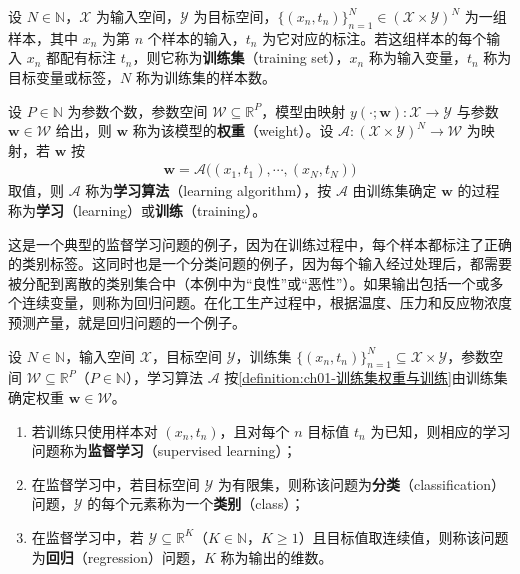 \documentclass[../../main.tex]{subfiles}
\begin{document}
\begin{definition}\label{definition:ch01-训练集权重与训练}
设 $N\in\mathbb{N}$，$\mathcal{X}$ 为输入空间，$\mathcal{Y}$ 为目标空间，$\{(x_n,t_n)\}_{n=1}^{N}\in(\mathcal{X}\times\mathcal{Y})^{N}$ 为一组样本，其中 $x_n$ 为第 $n$ 个样本的输入，$t_n$ 为它对应的标注。若这组样本的每个输入 $x_n$ 都配有标注 $t_n$，则它称为\textbf{训练集}（training set），$x_n$ 称为输入变量，$t_n$ 称为目标变量或标签，$N$ 称为训练集的样本数。

设 $P\in\mathbb{N}$ 为参数个数，参数空间 $\mathcal{W}\subseteq\mathbb{R}^{P}$，模型由映射 $y(\cdot;\mathbf{w}):\mathcal{X}\to\mathcal{Y}$ 与参数 $\mathbf{w}\in\mathcal{W}$ 给出，则 $\mathbf{w}$ 称为该模型的\textbf{权重}（weight）。设 $\mathcal{A}:(\mathcal{X}\times\mathcal{Y})^{N}\to\mathcal{W}$ 为映射，若 $\mathbf{w}$ 按
\begin{align*}
  \mathbf{w}=\mathcal{A}\bigl((x_1,t_1),\cdots,(x_N,t_N)\bigr)
\end{align*}
取值，则 $\mathcal{A}$ 称为\textbf{学习算法}（learning algorithm），按 $\mathcal{A}$ 由训练集确定 $\mathbf{w}$ 的过程称为\textbf{学习}（learning）或\textbf{训练}（training）。
\end{definition}

这是一个典型的监督学习问题的例子，因为在训练过程中，每个样本都标注了正确的类别标签。这同时也是一个分类问题的例子，因为每个输入经过处理后，都需要被分配到离散的类别集合中（本例中为“良性”或“恶性”）。如果输出包括一个或多个连续变量，则称为回归问题。在化工生产过程中，根据温度、压力和反应物浓度预测产量，就是回归问题的一个例子。

\begin{definition}\label{definition:ch01-监督学习分类与回归}
设 $N\in\mathbb{N}$，输入空间 $\mathcal{X}$，目标空间 $\mathcal{Y}$，训练集 $\{(x_n,t_n)\}_{n=1}^{N}\subseteq\mathcal{X}\times\mathcal{Y}$，参数空间 $\mathcal{W}\subseteq\mathbb{R}^{P}$（$P\in\mathbb{N}$），学习算法 $\mathcal{A}$ 按\cref{definition:ch01-训练集权重与训练}由训练集确定权重 $\mathbf{w}\in\mathcal{W}$。
\begin{enumerate}
  \item 若训练只使用样本对 $(x_n,t_n)$，且对每个 $n$ 目标值 $t_n$ 为已知，则相应的学习问题称为\textbf{监督学习}（supervised learning）；
  \item 在监督学习中，若目标空间 $\mathcal{Y}$ 为有限集，则称该问题为\textbf{分类}（classification）问题，$\mathcal{Y}$ 的每个元素称为一个\textbf{类别}（class）；
  \item 在监督学习中，若 $\mathcal{Y}\subseteq\mathbb{R}^{K}$（$K\in\mathbb{N}$，$K\geqslant1$）且目标值取连续值，则称该问题为\textbf{回归}（regression）问题，$K$ 称为输出的维数。
\end{enumerate}
\end{definition}
\end{document}
